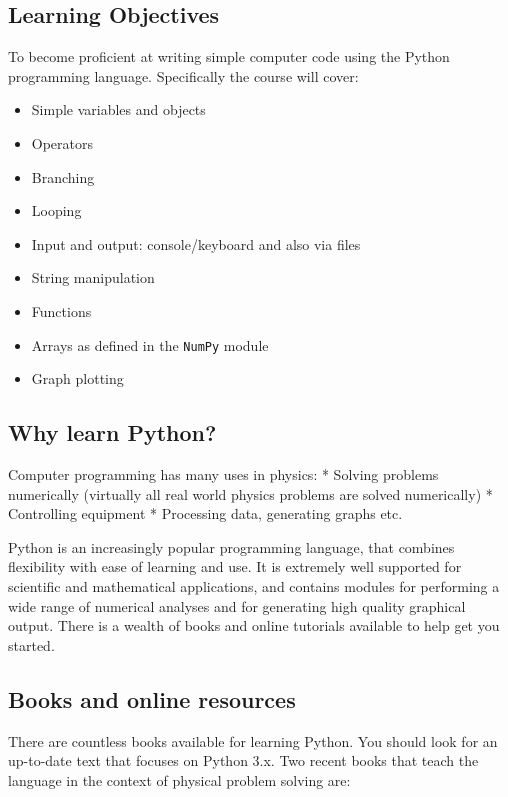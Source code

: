\documentclass[10pt]{article}
\providecommand{\tightlist}{%
      \setlength{\itemsep}{0pt}\setlength{\parskip}{0pt}}
\begin{document}
    \hypertarget{learning-objectives}{%
\subsection{Learning Objectives}\label{learning-objectives}}

To become proficient at writing simple computer code using the Python
programming language. Specifically the course will cover:

\begin{itemize}
\tightlist
\item
  Simple variables and objects
\item
  Operators
\item
  Branching
\item
  Looping
\item
  Input and output: console/keyboard and also via files
\item
  String manipulation
\item
  Functions
\item
  Arrays as defined in the \texttt{NumPy} module
\item
  Graph plotting
\end{itemize}

    \hypertarget{why-learn-python}{%
\subsection{Why learn Python?}\label{why-learn-python}}

Computer programming has many uses in physics: * Solving problems
numerically (virtually all real world physics problems are solved
numerically) * Controlling equipment * Processing data, generating
graphs etc.

Python is an increasingly popular programming language, that combines
flexibility with ease of learning and use. It is extremely well
supported for scientific and mathematical applications, and contains
modules for performing a wide range of numerical analyses and for
generating high quality graphical output. There is a wealth of books and
online tutorials available to help get you started.

    \hypertarget{books-and-online-resources}{%
\subsection{Books and online
resources}\label{books-and-online-resources}}

There are countless books available for learning Python. You should look
for an up-to-date text that focuses on Python 3.x. Two recent books that
teach the language in the context of physical problem solving are:
\end{document}
